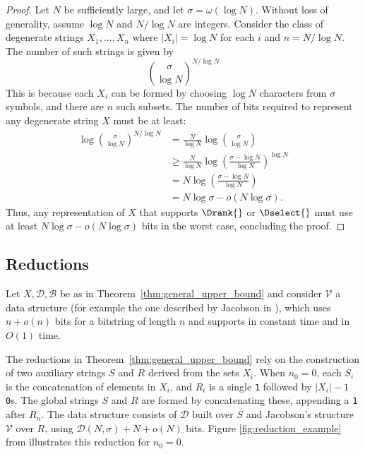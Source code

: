 \begin{proof}
    Let $N$ be sufficiently large, and let $\sigma = \omega(\log N)$. Without loss of generality, assume $\log N$ and $N / \log N$ are integers. Consider the class of degenerate strings $X_1, \ldots, X_n$ where $|X_i| = \log N$ for each $i$ and $n = N / \log N$. The number of such strings is given by
    \begin{equation}
        \binom{\sigma}{\log N}^{N / \log N}
    \end{equation}
    This is because each $X_i$ can be formed by choosing $\log N$ characters from $\sigma$ symbols, and there are $n$ such subsets. The number of bits required to represent any degenerate string $X$ must be at least:
    \begin{align*}
        \log \binom{\sigma}{\log N}^{N / \log N} & = \frac{N}{\log N} \log \binom{\sigma}{\log N}                                    \\
                                                 & \geq \frac{N}{\log N} \log \left( \frac{\sigma - \log N}{\log N} \right)^{\log N} \\
                                                 & = N \log \left( \frac{\sigma - \log N}{\log N} \right)                            \\
                                                 & = N \log \sigma - o(N \log \sigma).
    \end{align*}
    Thus, any representation of $X$ that supports $\Drank{}$ or $\Dselect{}$ must use at least $N \log \sigma - o(N \log \sigma)$ bits in the worst case, concluding the proof.
\end{proof}

\subsection{Reductions}{\label{sec:reductions}}

Let $X, \mathcal{D}, \mathcal{B}$ be as in Theorem~\ref{thm:general_upper_bound} and consider $\mathcal{V}$ a data structure (for example the one described by Jacobson in \cite{Jacobson}), which uses $n +o(n)$ bits for a bitstring of length $n$ and supports \Rank{} in constant time and \Select{} in $O(1)$ time. \vspace{1em}

\noindent The reductions in Theorem~\ref{thm:general_upper_bound} rely on the construction of two auxiliary strings $S$ and $R$ derived from the sets $X_i$. When $n_0 = 0$, each $S_i$ is the concatenation of elements in $X_i$, and $R_i$ is a single \texttt{1} followed by $|X_i| - 1$ \texttt{0}s. The global strings $S$ and $R$ are formed by concatenating these, appending a \texttt{1} after $R_n$. The data structure consists of $\mathcal{D}$ built over $S$ and Jacobson's structure $\mathcal{V}$ over $R$, using $\mathcal{D}(N,\sigma) + N + o(N)$ bits. Figure \ref{fig:reduction_example} from \cite{bille2023rank} illustrates this reduction for $n_0 = 0$. \vspace{1em}

